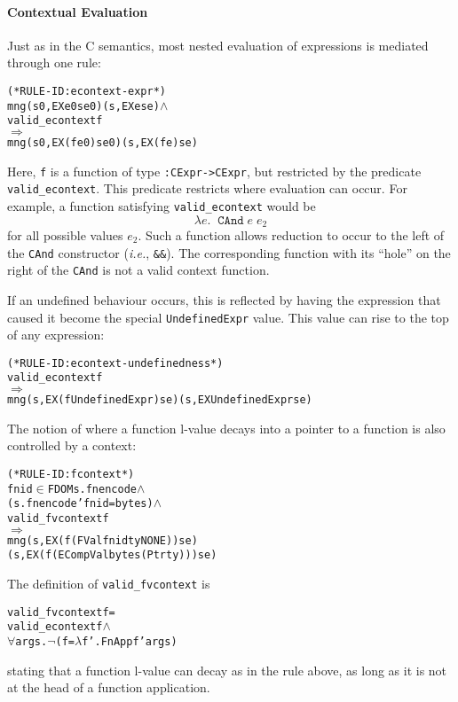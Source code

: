 \documentclass[11pt]{article}
\newcommand{\ie}{\emph{i.e.}}
\begin{document}
\paragraph{Contextual Evaluation}
Just as in the C semantics, most nested evaluation of expressions is
mediated through one rule: \label{rule:econtext-expr}
\begin{alltt}
(* RULE-ID: econtext-expr *)
     mng (s0, EX e0 se0) (s, EX e se) \(\land\)
     valid_econtext f
   \(\Rightarrow\)
     mng (s0, EX (f e0) se0) (s, EX (f e) se)
\end{alltt}
Here, \texttt{f} is a function of type \texttt{:CExpr->CExpr},
but restricted by the predicate \texttt{valid_econtext}.  This
predicate restricts where evaluation can occur.  For example, a
function satisfying \texttt{valid_econtext} would be
\[
\lambda e.\;\;\texttt{CAnd}\;e\;e_2
\]
for all possible values $e_2$.  Such a function allows reduction to
occur to the left of the \texttt{CAnd} constructor (\ie,
\texttt{\&\&}).  The corresponding function with its ``hole'' on the
right of the \texttt{CAnd} is not a valid context function.

If an undefined behaviour occurs, this is reflected by having the
expression that caused it become the special \texttt{UndefinedExpr}
value.  This value can rise to the top of any expression:
%
\begin{alltt}
(* RULE-ID: econtext-undefinedness *)
     valid_econtext f
   \(\Rightarrow\)
     mng (s, EX (f UndefinedExpr) se) (s, EX UndefinedExpr se)
\end{alltt}

The notion of where a function l-value decays into a pointer to a
function is also controlled by a context:
%
\begin{alltt}
(* RULE-ID: fcontext *)
     fnid \(\in\) FDOM s.fnencode \(\land\)
     (s.fnencode ' fnid = bytes) \(\land\)
     valid_fvcontext f
   \(\Rightarrow\)
     mng (s, EX (f (FVal fnid ty NONE)) se)
         (s, EX (f (ECompVal bytes (Ptr ty))) se)
\end{alltt}
The definition of \texttt{valid_fvcontext} is
\begin{alltt}
   valid_fvcontext f =
      valid_econtext f \(\land\)
      \(\forall\)args. \(\neg\)(f = \(\lambda\)f'. FnApp f' args)
\end{alltt}
stating that a function l-value can decay as in the rule above, as
long as it is not at the head of a function application.
\end{document}
